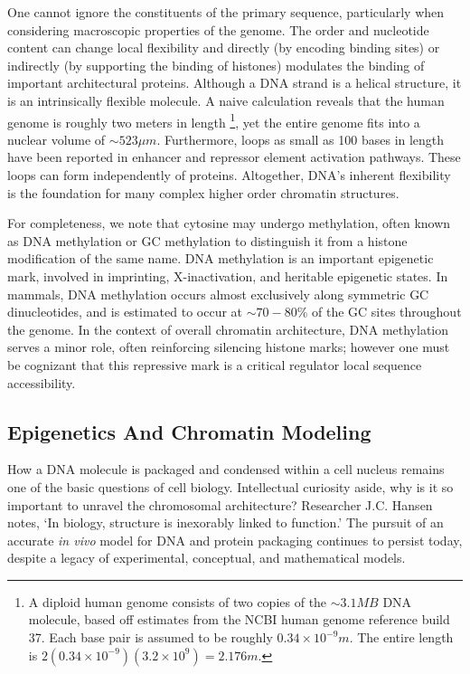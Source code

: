 One cannot ignore the constituents of the primary sequence, particularly when considering macroscopic properties of the genome.  The order and
nucleotide content can change local flexibility and directly (by encoding binding sites) or indirectly (by supporting the binding of histones)
modulates the binding of important architectural proteins\cite{travers2004}.  Although a \gls{DNA} strand is a helical structure, it is an intrinsically
flexible molecule.  A naive calculation reveals that the human genome is roughly two meters in length%
\footnote{%
  A diploid human genome consists of two copies of the $\sim3.1MB$ DNA molecule, based off estimates from the \gls{NCBI} human genome reference build 37.
  Each base pair is assumed to be roughly $0.34\times10^{-9}m$.  The entire length is $2(0.34 \times 10^{-9})(3.2 \times 10^9) = 2.176m$.
},
yet the entire genome fits into a nuclear volume of $\sim523\mu{}m$\cite{marks2011}.  Furthermore, loops as small as 100 bases in length have been
reported in enhancer and repressor element activation pathways\cite{wong2008}. These loops can form independently of proteins\cite{vafabakhsh2012}.
Altogether, \gls{DNA}'s inherent flexibility is the foundation for  many complex higher order chromatin structures.

For completeness, we note that cytosine may undergo methylation, often known as \gls{DNA} methylation or GC methylation to distinguish it
from a histone modification of the same name\cite{bird2002}.  \gls{DNA} methylation is an important epigenetic mark, involved in imprinting,
\gls{X-inactivation}, and heritable epigenetic states\cite{law2010}.  In mammals, \gls{DNA} methylation occurs almost exclusively along
symmetric \gls{GC} dinucleotides, and is estimated to occur at $\sim70-80\%$ of the \gls{GC} sites throughout the genome\cite{ehrlich1982}\cite{law2010}.
In the context of overall chromatin architecture, \gls{DNA} methylation serves a minor role, often reinforcing silencing histone marks; however
one must be cognizant that this repressive mark is a critical regulator local sequence accessibility.

\subsection*{Epigenetics And Chromatin Modeling}

How a \gls{DNA} molecule is packaged and condensed within a cell nucleus remains one of the basic questions of cell biology.  Intellectual curiosity aside,
why is it so important to unravel the chromosomal architecture?  Researcher J.C. Hansen notes, `In biology, structure is inexorably linked to function.'\cite{hansen2012}
The pursuit of an accurate \textit{\gls{in vivo}} model for \gls{DNA} and protein packaging continues to persist today, despite a legacy of experimental,
conceptual, and mathematical models.


